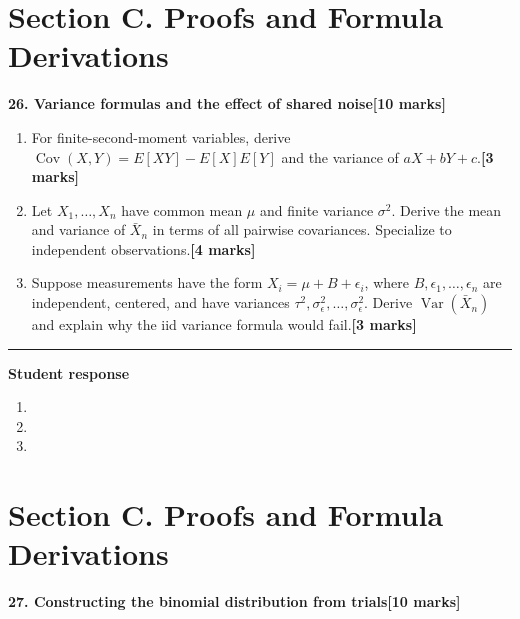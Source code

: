 \documentclass[11pt,a4paper]{article}
\newlength{\BlankAnswerHeight}\setlength{\BlankAnswerHeight}{16mm}
\newcommand{\AnswerBlank}{\leavevmode\par\vspace{\BlankAnswerHeight}}
\begin{document}
\newpage\section*{Section C. Proofs and Formula Derivations}
\textbf{26. Variance formulas and the effect of shared noise}\hfill\textbf{[10 marks]}\par\medskip
\begin{enumerate}[label=(\alph*),leftmargin=8mm,itemsep=3pt]
\item For finite-second-moment variables, derive \(\operatorname{Cov}(X,Y)=E[XY]-E[X]E[Y]\) and the variance of \(aX+bY+c\).\hfill\textbf{[3 marks]}
\item Let \(X_1,\ldots,X_n\) have common mean \(\mu\) and finite variance \(\sigma^2\). Derive the mean and variance of \(\bar X_n\) in terms of all pairwise covariances. Specialize to independent observations.\hfill\textbf{[4 marks]}
\item Suppose measurements have the form \(X_i=\mu+B+\epsilon_i\), where \(B,\epsilon_1,\ldots,\epsilon_n\) are independent, centered, and have variances \(\tau^2,\sigma_\epsilon^2,\ldots,\sigma_\epsilon^2\). Derive \(\operatorname{Var}(\bar X_n)\) and explain why the iid variance formula would fail.\hfill\textbf{[3 marks]}
\end{enumerate}\par\medskip\hrule\medskip\textbf{Student response}\par
\begin{enumerate}[label=(\alph*),leftmargin=8mm,itemsep=3pt]
\item
\AnswerBlank
\item
\AnswerBlank
\item
\AnswerBlank
\end{enumerate}
\newpage\section*{Section C. Proofs and Formula Derivations}
\textbf{27. Constructing the binomial distribution from trials}\hfill\textbf{[10 marks]}\par\medskip
\end{document}
